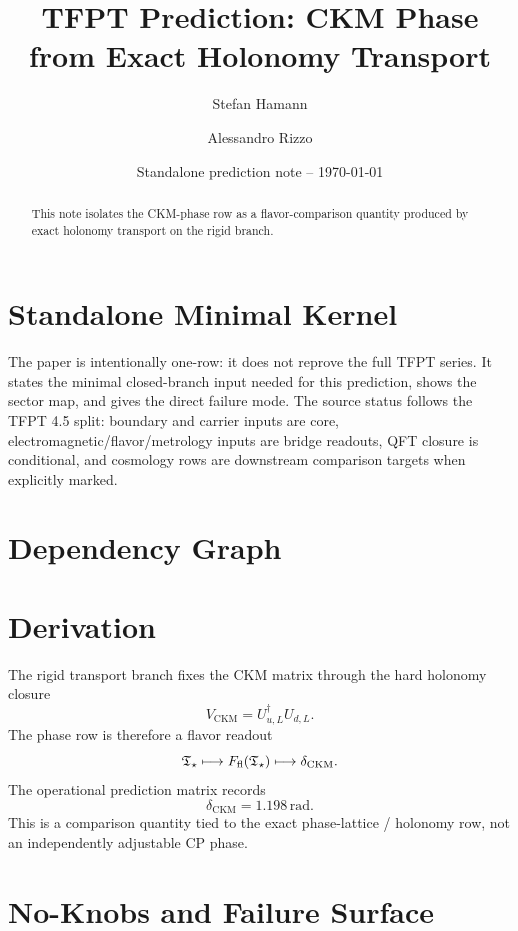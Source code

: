 \documentclass[11pt,a4paper]{article}
\title{\color{tfptblue}\textbf{TFPT Prediction: CKM Phase from Exact Holonomy Transport}}
\author{Stefan Hamann \and Alessandro Rizzo}
\date{{\normalsize\color{tfptgray}\sffamily Standalone prediction note -- \today}}
\begin{document}
\maketitle

\begin{abstract}
This note isolates the CKM-phase row as a flavor-comparison quantity produced by exact holonomy transport on the rigid branch.
\end{abstract}



\section{Standalone Minimal Kernel}
\MinimalKernelBox

The paper is intentionally one-row: it does not reprove the full TFPT series. It states the minimal closed-branch input needed for this prediction, shows the sector map, and gives the direct failure mode. The source status follows the TFPT 4.5 split: boundary and carrier inputs are core, electromagnetic/flavor/metrology inputs are bridge readouts, QFT closure is conditional, and cosmology rows are downstream comparison targets when explicitly marked.


\section{Dependency Graph}

\section{Derivation}

The rigid transport branch fixes the CKM matrix through the hard holonomy closure
\[
V_{\mathrm{CKM}}=U_{u,L}^{\dagger}U_{d,L}.
\]
The phase row is therefore a flavor readout
\[
\mathfrak T_{\star}\longmapsto F_{\mathrm{fl}}(\mathfrak T_{\star})\longmapsto \delta_{\mathrm{CKM}}.
\]
The operational prediction matrix records
\[
\delta_{\mathrm{CKM}}=1.198\,\mathrm{rad}.
\]
This is a comparison quantity tied to the exact phase-lattice / holonomy row, not an independently adjustable CP phase.


\section{No-Knobs and Failure Surface}
\end{document}
